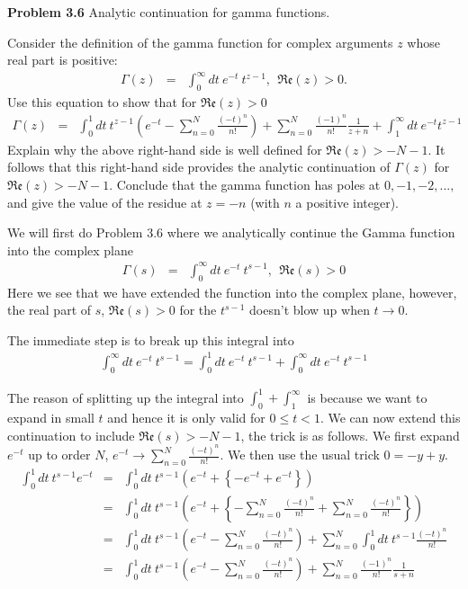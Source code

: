 \documentclass[aps,preprint,preprintnumbers,nofootinbib,showpacs,prd]{revtex4-1}
\newcommand{\nbea}{\begin{eqnarray*}}
\newcommand{\neea}{\end{eqnarray*}}
\begin{document}
{\bf Problem 3.6} Analytic continuation for gamma functions.

Consider the definition of the gamma function for complex arguments $z$ whose real part is positive:
%
\nbea
\Gamma(z) & = & \int_0^\infty dt~e^{-t}~t^{z-1}, ~~ \mathfrak{Re}(z) > 0.
\neea
%
Use this equation to show that for $\mathfrak{Re}(z) > 0$
%
\nbea
\Gamma(z) & = & \int_0^1 dt ~t^{z-1} \left ( e^{-t} - \sum_{n=0}^N \frac{(-t)^n}{n!} \right ) + \sum_{n=0}^N \frac{(-1)^n}{n!} \frac{1}{z+n} + \int_1^\infty dt~e^{-t} t^{z-1}
\neea
%
Explain why the above right-hand side is well defined for $\mathfrak{Re}(z) > -N-1$. It follows that this right-hand side provides the analytic continuation of $\Gamma(z)$ for $\mathfrak{Re}(z) > -N-1$. Conclude that the gamma function has poles at $0, -1, -2, ... ,$ and give the value of the residue at $z = -n$ (with $n$ a positive integer).

We will first do Problem 3.6 where we analytically continue the Gamma function into the complex plane
%
\nbea
\Gamma(s) & = & \int_0^\infty dt ~ e^{-t}~t^{s-1}, ~~ \mathfrak{Re}(s) > 0
\neea
%
Here we see that we have extended the function into the complex plane, however, the real part of $s$, $\mathfrak{Re}(s) > 0$ for the $t^{s-1}$ doesn't blow up when $t \rightarrow 0$.

The immediate step is to break up this integral into
%
\nbea
\int_0^\infty dt ~ e^{-t}~t^{s-1} = \int_0^1 dt ~ e^{-t}~t^{s-1} + \int_0^\infty dt ~ e^{-t}~t^{s-1}
\neea
%

The reason of splitting up the integral into $\int_0^1 + \int_1^\infty$ is because we want to expand in small $t$ and hence it is only valid for $0 \leq t < 1$. We can now extend this continuation to include $\mathfrak{Re}(s) > - N - 1$, the trick is as follows. We first expand $e^{-t}$ up to order $N$, $e^{-t} \rightarrow \sum\limits_{n=0}^{N} \frac{(-t)^n}{n!}$. We then use the usual trick $0 = -y + y$.
%
\nbea
\int_0^1 dt ~ t^{s-1} e^{-t} & = & \int_0^1 dt ~ t^{s-1} \left ( e^{-t} + \left \{-e^{-t} + e^{-t} \right \} \right ) \\
& = & \int_0^1 dt ~ t^{s-1} \left ( e^{-t} + \left \{-\sum\limits_{n=0}^{N} \frac{(-t)^n}{n!} + \sum\limits_{n=0}^{N} \frac{(-t)^n}{n!} \right \} \right ) \\
& = & \int_0^1 dt ~ t^{s-1} \left ( e^{-t} -\sum\limits_{n=0}^{N} \frac{(-t)^n}{n!} \right )  + \sum\limits_{n=0}^{N} \int_0^1 dt ~ t^{s-1} \frac{(-t)^n}{n!} \\
& = & \int_0^1 dt ~ t^{s-1} \left ( e^{-t} -\sum\limits_{n=0}^{N} \frac{(-t)^n}{n!} \right )  + \sum\limits_{n=0}^{N} \frac{(-1)^n}{n!} \frac{1}{s+n} 
\neea
%
\end{document}

